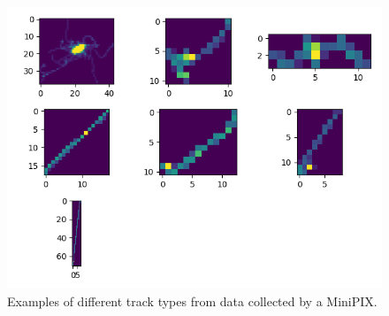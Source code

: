 \begin{figure}[h]
    \includegraphics[scale=1, width=.75\textwidth]{Figures/Tracks.png}
    \caption{Examples of different track types from data collected by a MiniPIX.}
    \label{fig:Tracks}
\end{figure}

